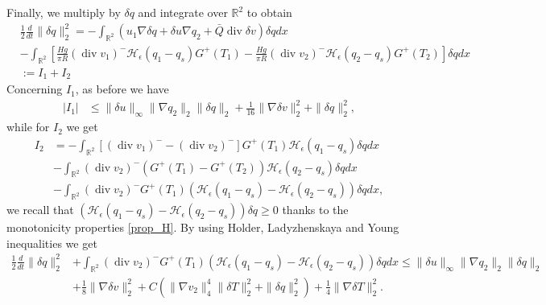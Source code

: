 \documentclass[11pt, a4paper, article,reqno,]{amsart}
\theoremstyle{remark}
\DeclareMathOperator{\dive}{div}
\numberwithin{equation}{section}
\begin{document}
Finally, we multiply by $\delta q$ and integrate over $\mathbb{R}^2$ to obtain
\begin{equation}\label{est_q}
    \begin{aligned}
        & \frac{1}{2}\frac{d}{dt} \|\delta q\|_2^2 = - \int_{\mathbb{R}^2}  (u_1 \nabla \delta q + \delta u \nabla q_2 + \bar{Q} \dive \delta v) \delta q dx \\
        & - \int_{\mathbb{R}^2} \left[ \frac{H g}{\pi R}(\dive v_1)^-\mathcal{H}_\epsilon(q_1-q_s) G^+(T_1) - \frac{H g}{\pi R}(\dive v_2)^- \mathcal{H}_\epsilon(q_2-q_s) G^+(T_2) \right] \delta qdx \\
        & := I_1+ I_2
    \end{aligned}
\end{equation}
Concerning $I_1$, as before we have
\begin{equation*}
    \begin{aligned}
        |I_1| & \leq \|\delta u\|_\infty \|\nabla q_2\|_2\|\delta q\|_2 + \frac{1}{16} \|\nabla \delta v\|_2^2 + \|\delta q\|_2^2,
    \end{aligned}
\end{equation*}
while for $I_2$ we get
\begin{equation*}
    \begin{aligned}
        I_2 & = - \int_{\mathbb{R}^2} [(\dive v_1)^- -(\dive v_2)^-]G^+(T_1) \mathcal{H}_\epsilon(q_1 -q_s) \delta qdx \\
        & -  \int_{\mathbb{R}^2} (\dive v_2)^-(G^+(T_1)-G^+(T_2))\mathcal{H}_\epsilon(q_2 -q_s)\delta q dx \\
        &- \int_{\mathbb{R}^2} (\dive v_2)^- G^+(T_1)(\mathcal{H}_\epsilon(q_1 -q_s) - \mathcal{H}_\epsilon(q_2 -q_s))\delta q dx,
    \end{aligned}
\end{equation*}
we recall that $(\mathcal{H}_\epsilon(q_1 -q_s) - \mathcal{H}_\epsilon(q_2 -q_s))\delta q \geq 0$ thanks to the monotonicity properties \eqref{prop_H}. By using  Holder, Ladyzhenskaya and Young inequalities we get
\begin{equation}\label{pt_1_3}
    \begin{aligned}
        \frac{1}{2}\frac{d}{dt} \|\delta q\|_2^2 & + \int_{\mathbb{R}^2} (\dive v_2)^- G^+(T_1)(\mathcal{H}_\epsilon(q_1 -q_s) - \mathcal{H}_\epsilon(q_2 -q_s))\delta q dx  \leq \|\delta u\|_\infty \|\nabla q_2\|_2\|\delta q\|_2 \\
        & + \frac{1}{8} \|\nabla \delta v\|_2^2 + C( \|\nabla v_2\|_4^4 \|\delta T\|_2^2 + \|\delta q\|_2^2 ) + \frac{1}{4} \|\nabla \delta T\|_2^2.
    \end{aligned}
\end{equation}
\end{document}

